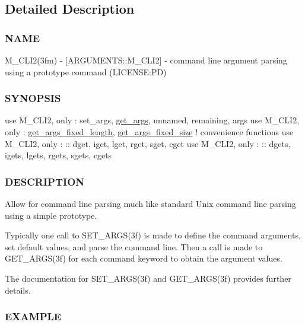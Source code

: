 \subsection{Detailed Description}
\subsubsection*{N\+A\+ME}

M\+\_\+\+C\+L\+I2(3fm) -\/ \mbox{[}A\+R\+G\+U\+M\+E\+N\+T\+S\+::\+M\+\_\+\+C\+L\+I2\mbox{]} -\/ command line argument parsing using a prototype command (L\+I\+C\+E\+N\+SE\+:PD) \subsubsection*{S\+Y\+N\+O\+P\+S\+IS}

use M\+\_\+\+C\+L\+I2, only \+: set\+\_\+args, \mbox{\hyperlink{interfacem__cli2_1_1get__args}{get\+\_\+args}}, unnamed, remaining, args use M\+\_\+\+C\+L\+I2, only \+: \mbox{\hyperlink{interfacem__cli2_1_1get__args__fixed__length}{get\+\_\+args\+\_\+fixed\+\_\+length}}, \mbox{\hyperlink{interfacem__cli2_1_1get__args__fixed__size}{get\+\_\+args\+\_\+fixed\+\_\+size}} ! convenience functions use M\+\_\+\+C\+L\+I2, only \+: \+:\+: dget, iget, lget, rget, sget, cget use M\+\_\+\+C\+L\+I2, only \+: \+:\+: dgets, igets, lgets, rgets, sgets, cgets

\subsubsection*{D\+E\+S\+C\+R\+I\+P\+T\+I\+ON}

Allow for command line parsing much like standard Unix command line parsing using a simple prototype.

Typically one call to S\+E\+T\+\_\+\+A\+R\+G\+S(3f) is made to define the command arguments, set default values, and parse the command line. Then a call is made to G\+E\+T\+\_\+\+A\+R\+G\+S(3f) for each command keyword to obtain the argument values.

The documentation for S\+E\+T\+\_\+\+A\+R\+G\+S(3f) and G\+E\+T\+\_\+\+A\+R\+G\+S(3f) provides further details.

\subsubsection*{E\+X\+A\+M\+P\+LE}

